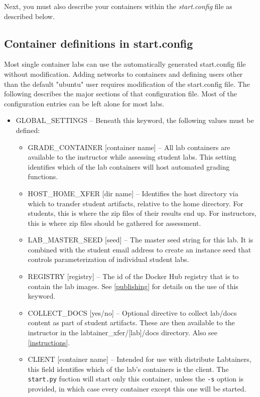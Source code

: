 \documentclass[12pt]{article}
\begin{document}
Next, you must also describe your containers within the \textit{start.config} file as described below.

\subsection{Container definitions in start.config}
\label{start config}
Most single container labs can use the automatically generated start.config file
without modification.  Adding networks to containers and defining users other than the
default "ubuntu" user requires modification of the start.config file.
The following describes the major sections of that configuration file.  Most of the configuration
entries can be left alone for most labs.
\begin{itemize}
\item GLOBAL\_SETTINGS -- Beneath this keyword, the following values must be defined:

\begin{itemize}
\item GRADE\_CONTAINER [container name] -- All lab containers are available to the instructor while assessing student labs.
This setting identifies which of the lab containers will host automated grading functions.
\item HOST\_HOME\_XFER [dir name] --  Identifies the host directory via which to transfer student artifacts, relative to 
the home directory.  For students, this is where the zip files of their results end up.  For instructors, this is
where zip files should be gathered for assessment.
\item LAB\_MASTER\_SEED [seed] -- The master seed string for this lab.  It is combined with the student email
address to create an instance seed that controls parameterization of individual student labs.
\item REGISTRY [registry] -- The id of the Docker Hub registry that is to contain the lab images.
See \ref{publishing} for details on the use of this keyword.
\item COLLECT\_DOCS [yes/no] -- Optional directive to collect lab/docs content as part of student artifacts.
These are then available to the instructor in the labtainer\_xfer/[lab]/docs directory.  Also see \ref{instructions}.
\item CLIENT [container name] -- Intended for use with distribute Labtainers, this field identifies which of the lab's 
containers is the client.  The {\tt start.py} fuction will start only this container, unless the {\tt -s} option is provided,
in which case every container except this one will be started.
\end{itemize}


\end{itemize}
\end{document}

